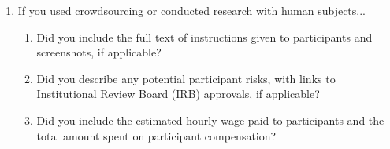 \documentclass{article}
\theoremstyle{plain}
\theoremstyle{definition}
\begin{document}
\begin{enumerate}
\item If you used crowdsourcing or conducted research with human subjects...
\begin{enumerate}
  \item Did you include the full text of instructions given to participants and screenshots, if applicable?
  \item Did you describe any potential participant risks, with links to Institutional Review Board (IRB) approvals, if applicable?
  \item Did you include the estimated hourly wage paid to participants and the total amount spent on participant compensation?
\end{enumerate}

\end{enumerate}
\end{document}
